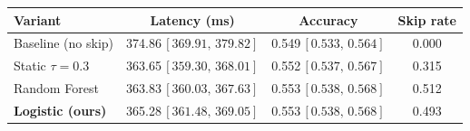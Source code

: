 \begin{tabular}{lccc}
\toprule
Variant & Latency (ms) & Accuracy & Skip rate \\
\midrule
Baseline (no skip) & 374.86\,{\scriptsize$[369.91,\,379.82]$} & 0.549\,{\scriptsize$[0.533,\,0.564]$} & 0.000 \\
Static $\tau=0.3$ & 363.65\,{\scriptsize$[359.30,\,368.01]$} & 0.552\,{\scriptsize$[0.537,\,0.567]$} & 0.315 \\
Random Forest & 363.83\,{\scriptsize$[360.03,\,367.63]$} & 0.553\,{\scriptsize$[0.538,\,0.568]$} & 0.512 \\
\textbf{Logistic (ours)} & 365.28\,{\scriptsize$[361.48,\,369.05]$} & 0.553\,{\scriptsize$[0.538,\,0.568]$} & 0.493 \\
\bottomrule
\end{tabular}
